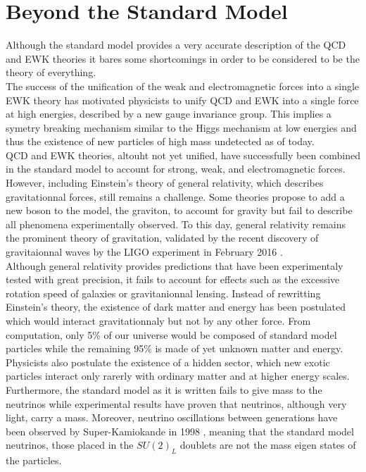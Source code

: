   \section{Beyond the Standard Model}

    Although the standard model provides a very accurate description of the QCD and EWK theories it bares some shortcomings in order to be considered to be the theory of everything. \\

    The success of the unification of the weak and electromagnetic forces into a single EWK theory has motivated physicists to unify QCD and EWK into a single force at high energies, described by a new gauge invariance group. This implies a symetry breaking mechanism similar to the Higgs mechanism at low energies and thus the existence of new particles of high mass undetected as of today. \\

    QCD and EWK theories, altouht not yet unified, have successfully been combined in the standard model to account for strong, weak, and electromagnetic forces. However, including Einstein's theory of general relativity, which describes gravitationnal forces, still remains a challenge. Some theories propose to add a new boson to the model, the graviton, to account for gravity but fail to describe all phenomena experimentally observed. To this day, general relativity remains the prominent theory of gravitation, validated by the recent discovery of gravitaionnal waves by the LIGO experiment in February 2016 \cite{PhysRevLett.116.061102}. \\

    Although general relativity provides predictions that have been experimentaly tested with great precision, it fails to account for effects such as the excessive rotation speed of galaxies or gravitanionnal lensing. Instead of rewritting Einstein's theory, the existence of dark matter and energy has been postulated which would interact gravitationnaly but not by any other force. From computation, only 5\% of our universe would be composed of standard model particles while the remaining 95\% is made of yet unknown matter and energy. Physicists also postulate the existence of a hidden sector, which new exotic particles interact only rarerly with ordinary matter and at higher energy scales. \\

    Furthermore, the standard model as it is written fails to give mass to the neutrinos while experimental results have proven that neutrinos, although very light, carry a mass. Moreover, neutrino oscillations between generations have been observed by Super-Kamiokande in 1998 \cite{Fukuda:1998mi}, meaning that the standard model neutrinos, those placed in the $ SU(2)_L $ doublets are not the mass eigen states of the particles. \\

